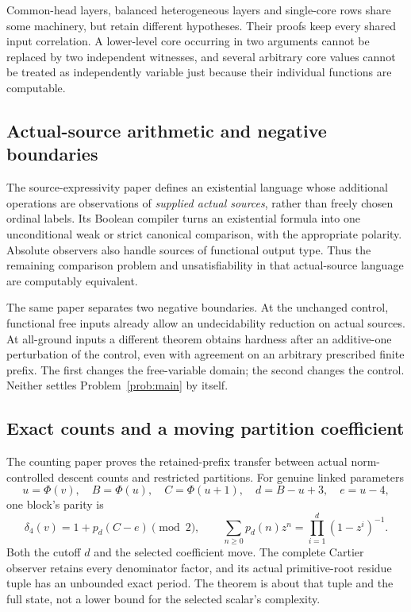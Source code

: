 \documentclass[11pt,a4paper]{article}
\begin{document}
Common-head layers, balanced heterogeneous layers and single-core rows share
some machinery, but retain different hypotheses.  Their proofs keep every
shared input correlation.  A lower-level core occurring in two arguments
cannot be replaced by two independent witnesses, and several arbitrary core
values cannot be treated as independently variable just because their
individual functions are computable.

\subsection{Actual-source arithmetic and negative boundaries}
The source-expressivity paper \cite{wwexpressivity} defines an existential
language whose additional operations are observations of \emph{supplied
actual sources}, rather than freely chosen ordinal labels.  Its Boolean
compiler turns an existential formula into one unconditional weak or strict
canonical comparison, with the appropriate polarity.  Absolute observers
also handle sources of functional output type.  Thus the remaining comparison
problem and unsatisfiability in that actual-source language are computably
equivalent.

The same paper separates two negative boundaries.  At the unchanged control,
functional free inputs already allow an undecidability reduction on actual
sources.  At all-ground inputs a different theorem obtains hardness after
an additive-one perturbation of the control, even with agreement on an
arbitrary prescribed finite prefix.  The first changes the free-variable
domain; the second changes the control.  Neither settles
Problem~\ref{prob:main} by itself.

\subsection{Exact counts and a moving partition coefficient}
The counting paper \cite{wwcounts} proves the retained-prefix transfer
between actual norm-controlled descent counts and restricted partitions.
For genuine linked parameters
\[
 u=\Phi(v),\quad B=\Phi(u),\quad C=\Phi(u+1),\quad
 d=B-u+3,\quad e=u-4,
\]
one block's parity is
\[
 \delta_4(v)=1+p_d(C-e)\pmod2,\qquad
 \sum_{n\ge0}p_d(n)z^n=\prod_{i=1}^d(1-z^i)^{-1}.
\]
Both the cutoff $d$ and the selected coefficient move.  The complete
Cartier observer retains every denominator factor, and its actual
primitive-root residue tuple has an unbounded exact period.
The theorem is about that tuple and the full state, not a lower bound
for the selected scalar's complexity.
\end{document}
